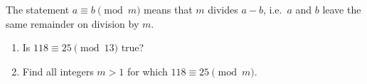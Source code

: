 The statement $a\equiv b\pmod m$ means that $m$ divides $a-b$, i.e.\ $a$ and $b$ leave the same remainder on division by $m$.
\begin{enumerate}
\item[(a)] Is $118\equiv25\pmod{13}$ true?
\item[(b)] Find all integers $m>1$ for which $118\equiv25\pmod m$.
\end{enumerate}
